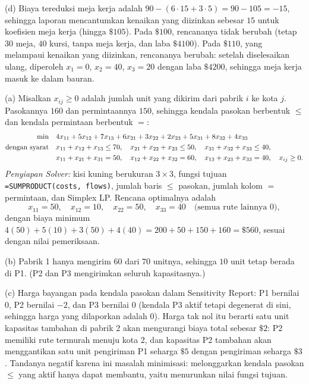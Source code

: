 (d) Biaya tereduksi meja kerja adalah $90 - (6 \cdot 15 + 3 \cdot 5) = 90 - 105 = -15$, sehingga laporan mencantumkan kenaikan yang diizinkan sebesar $15$ untuk koefisien meja kerja (hingga $\$105$). Pada $\$100$, rencananya tidak berubah (tetap $30$ meja, $40$ kursi, tanpa meja kerja, dan laba $\$4100$). Pada $\$110$, yang melampaui kenaikan yang diizinkan, rencananya berubah: setelah diselesaikan ulang, diperoleh $x_1 = 0$, $x_2 = 40$, $x_3 = 20$ dengan laba $\$4200$, sehingga meja kerja masuk ke dalam bauran.


(a) Misalkan $x_{ij} \geq 0$ adalah jumlah unit yang dikirim dari pabrik $i$ ke kota $j$. Pasokannya $160$ dan permintaannya $150$, sehingga kendala pasokan berbentuk $\leq$ dan kendala permintaan berbentuk $=$:
\begin{align*}
\min \quad & 4x_{11} + 5x_{12} + 7x_{13} + 6x_{21} + 3x_{22} + 2x_{23} + 5x_{31} + 8x_{32} + 4x_{33}\\
\mbox{dengan syarat}\quad & x_{11}+x_{12}+x_{13} \leq 70, \quad x_{21}+x_{22}+x_{23} \leq 50, \quad x_{31}+x_{32}+x_{33} \leq 40,\\
& x_{11}+x_{21}+x_{31} = 50, \quad x_{12}+x_{22}+x_{32} = 60, \quad x_{13}+x_{23}+x_{33} = 40, \quad x_{ij} \geq 0.
\end{align*}
\emph{Penyiapan Solver:} kisi kuning berukuran $3 \times 3$, fungsi tujuan \texttt{=SUMPRODUCT(costs, flows)}, jumlah baris $\leq$ pasokan, jumlah kolom $=$ permintaan, dan Simplex LP. Rencana optimalnya adalah
\[
x_{11} = 50, \quad x_{12} = 10, \quad x_{22} = 50, \quad x_{33} = 40 \quad \text{(semua rute lainnya 0)},
\]
dengan biaya minimum $4(50) + 5(10) + 3(50) + 4(40) = 200 + 50 + 150 + 160 = \$560$, sesuai dengan nilai pemeriksaan.

(b) Pabrik 1 hanya mengirim $60$ dari $70$ unitnya, sehingga $10$ unit tetap berada di P1. (P2 dan P3 mengirimkan seluruh kapasitasnya.)

(c) Harga bayangan pada kendala pasokan dalam Sensitivity Report: P1 bernilai $0$, P2 bernilai $-2$, dan P3 bernilai $0$ (kendala P3 aktif tetapi degenerat di sini, sehingga harga yang dilaporkan adalah $0$). Harga tak nol itu berarti satu unit kapasitas tambahan di pabrik 2 akan mengurangi biaya total sebesar $\$2$: P2 memiliki rute termurah menuju kota 2, dan kapasitas P2 tambahan akan menggantikan satu unit pengiriman P1 seharga $\$5$ dengan pengiriman seharga $\$3$. Tandanya negatif karena ini masalah minimisasi: melonggarkan kendala pasokan $\leq$ yang aktif hanya dapat membantu, yaitu menurunkan nilai fungsi tujuan.

